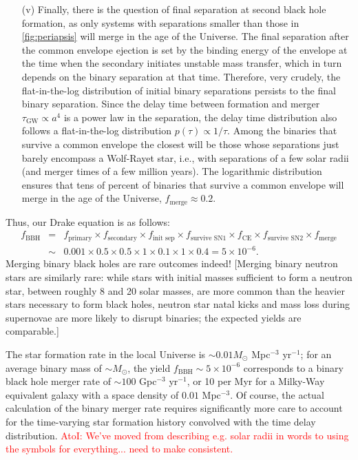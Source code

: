\documentclass[iop,onecolumn]{revtex4}
\newcommand{\ajf}[1]{\textcolor{red}{AtoI: #1}}
\begin{document}
\begin{enumerate}
\item[(v)]  Finally, there is the question of final separation at second black hole formation, as only systems with separations smaller than those in \autoref{fig:periapsis} will merge in the age of the Universe.  The final separation after the common envelope ejection is set by the binding energy of the envelope at the time when the secondary initiates unstable mass transfer, which in turn depends on the binary separation at that time.  Therefore, very crudely, the flat-in-the-log distribution of initial binary separations persists to the final binary separation.  Since the delay time between formation and merger $\tau_\textrm{GW} \propto a^4$ is a power law in the separation, the delay time distribution also follows a flat-in-the-log distribution $p(\tau) \propto 1/\tau$.  Among the binaries that survive a common envelope the closest will be those whose separations just barely encompass a Wolf-Rayet star, i.e., with separations of a few solar radii (and merger times of a few million years).  The logarithmic distribution ensures that tens of percent of binaries that survive a common envelope will merge in the age of the Universe, $f_\textrm{merge} \approx 0.2$.
\end{enumerate}

Thus, our Drake equation is as follows:
\begin{eqnarray}
f_\textrm{BBH} &=& f_\textrm{primary} \times f_\textrm{secondary} \times f_\textrm{init sep} \times f_\textrm{survive SN1} \times f_\textrm{CE} \times f_\textrm{survive SN2} \times f_\textrm{merge} \nonumber \\
 & \sim & 0.001 \times 0.5 \times 0.5 \times 1 \times 0.1 \times 1 \times 0.4 = 5 \times 10^{-6}.
\end{eqnarray}
Merging binary black holes are rare outcomes indeed!  [Merging binary neutron stars are similarly rare: while stars with initial masses sufficient to form a neutron star, between roughly 8 and 20 solar masses, are more common than the heavier stars necessary to form black holes, neutron star natal kicks and mass loss during supernovae are more likely to disrupt binaries; the expected yields are comparable.]

The star formation rate in the local Universe is $\sim 0.01 M_\odot$ Mpc$^{-3}$ yr$^{-1}$; for an average binary mass of $\sim M_\odot$, the yield $f_\textrm{BBH} \sim 5 \times 10^{-6}$ corresponds to a binary black hole merger rate of $\sim 100$ Gpc$^{-3}$ yr$^{-1}$, or 10 per Myr for a Milky-Way equivalent galaxy with a space density of $0.01$ Mpc$^{-3}$.  Of course, the actual calculation of the binary merger rate requires significantly more care to account for the time-varying star formation history convolved with the time delay distribution.  \ajf{We've moved from describing e.g. solar radii in words to using the symbols for everything... need to make consistent.}
\end{document}
